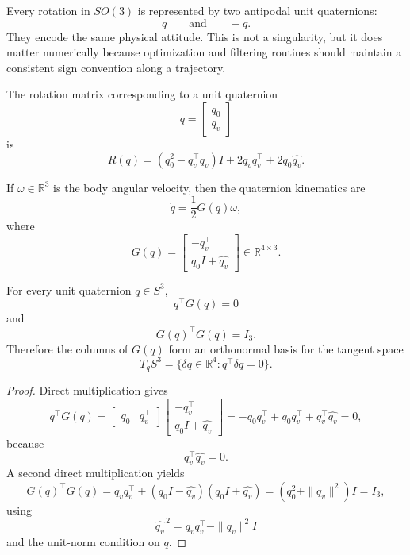 \begin{remark}
	Every rotation in $SO(3)$ is represented by two antipodal unit quaternions:
	\[
		q
		\qquad \text{and} \qquad
		-q.
	\]
	They encode the same physical attitude. This is not a singularity, but it does matter numerically because optimization and filtering routines should maintain a consistent sign convention along a trajectory.
\end{remark}

\begin{definition}\label{def:app-quaternion-to-rotation-map}
	The rotation matrix corresponding to a unit quaternion
	\[
		q=
		\begin{bmatrix}
			q_0 \\
			q_v
		\end{bmatrix}
	\]
	is
	\[
		R(q)
		=
		(q_0^2-q_v^\top q_v)I
		+
		2q_v q_v^\top
		+
		2q_0 \widehat{q_v}.
	\]
\end{definition}

\begin{definition}\label{def:app-quaternion-kinematics}
	If $\omega \in \mathbb{R}^{3}$ is the body angular velocity, then the quaternion kinematics are
	\[
		\dot q = \frac{1}{2}G(q)\omega,
	\]
	where
	\[
		G(q)
		=
		\begin{bmatrix}
			-q_v^\top \\
			q_0 I + \widehat{q_v}
		\end{bmatrix}
		\in \mathbb{R}^{4\times 3}.
	\]
\end{definition}

\begin{proposition}\label{prop:app-tangent-space-property-of-the-quaternion-kinematics-matrix}
	For every unit quaternion $q \in S^3$,
	\[
		q^\top G(q)=0
	\]
	and
	\[
		G(q)^\top G(q)=I_3.
	\]
	Therefore the columns of $G(q)$ form an orthonormal basis for the tangent space
	\[
		T_q S^3 = \{\delta q \in \mathbb{R}^{4}:q^\top \delta q=0\}.
	\]
\end{proposition}
\begin{proof}
	Direct multiplication gives
	\[
		q^\top G(q)
		=
		\begin{bmatrix}
			q_0 & q_v^\top
		\end{bmatrix}
		\begin{bmatrix}
			-q_v^\top \\
			q_0 I + \widehat{q_v}
		\end{bmatrix}
		=
		-q_0 q_v^\top + q_0 q_v^\top + q_v^\top \widehat{q_v}
		=
		0,
	\]
	because
	\[
		q_v^\top \widehat{q_v}=0.
	\]
	A second direct multiplication yields
	\[
		G(q)^\top G(q)
		=
		q_v q_v^\top + (q_0 I-\widehat{q_v})(q_0 I+\widehat{q_v})
		=
		(q_0^2+\|q_v\|^2)I
		=
		I_3,
	\]
	using
	\[
		\widehat{q_v}^{\,2}=q_v q_v^\top-\|q_v\|^2 I
	\]
	and the unit-norm condition on $q$.
\end{proof}

